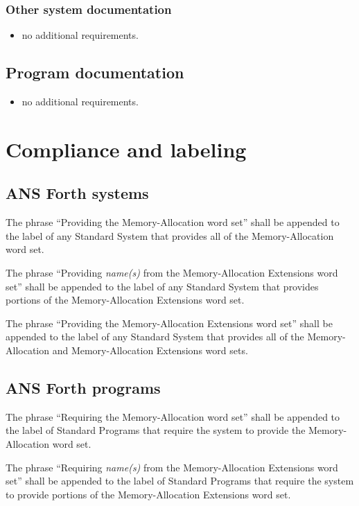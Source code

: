 \subsubsection{Other system documentation} %
\begin{itemize}
\item no additional requirements.
\end{itemize}

\subsection{Program documentation} %
\begin{itemize}
\item no additional requirements.
\end{itemize}

\section{Compliance and labeling} %

\subsection{ANS Forth systems} %

The phrase ``Providing the Memory-Allocation word set'' shall be
appended to the label of any Standard System that provides all of
the Memory-Allocation word set.

The phrase ``Providing \emph{name(s)} from the Memory-Allocation
Extensions word set'' shall be appended to the label of any Standard
System that provides portions of the Memory-Allocation Extensions
word set.

The phrase ``Providing the Memory-Allocation Extensions word set''
shall be appended to the label of any Standard System that provides
all of the Memory-Allocation and Memory-Allocation Extensions word
sets.

\subsection{ANS Forth programs} %

The phrase ``Requiring the Memory-Allocation word set'' shall be
appended to the label of Standard Programs that require the system
to provide the Memory-Allocation word set.

The phrase ``Requiring \emph{name(s)} from the Memory-Allocation
Extensions word set'' shall be appended to the label of Standard
Programs that require the system to provide portions of the
Memory-Allocation Extensions word set.

